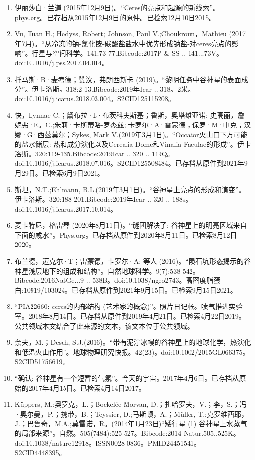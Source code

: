\begin{enumerate}
\item 伊丽莎白·兰道 (2015年12月9日)。“Ceres的亮点和起源的新线索”。phys.org。已存档从2015年12月9日的原件。已检索12月10日2015。
\item Vu, Tuan H.; Hodyss, Robert; Johnson, Paul V.;Choukroun，Mathieu (2017年7月)。“从冷冻的钠-氯化铵-碳酸盐盐水中优先形成钠盐-对ceres亮点的影响”。行星与空间科学。141:73-77.Bibcode:2017P & SS .. 141...73V。doi:10.1016/j.pss.2017.04.014。
\item 托马斯·B·麦考德；赞汶，弗朗西斯卡 (2019)。“黎明任务中谷神星的表面成分”。伊卡洛斯。318:2-13.Bibcode:2019年Icar .. 318。2米。doi:10.1016/j.icarus.2018.03.004。S2CID125115208。 
\item 快，Lynnae C.；黛布拉·L·布茨科夫斯基；鲁斯，奥塔维亚诺; 史高丽，詹妮弗·E。C.;朱莉·卡斯蒂略-罗杰兹; 卡罗尔·A·雷蒙德；保罗·M·申克；汉娜·G·西兹莫尔；Sykes, Mark V.(2019年3月1日)。“Occator火山口下方可能的盐水储层: 热和成分演化以及Cerealia Dome和Vinalia Faculae的形成”。伊卡洛斯。320:119-135.Bibcode:2019Icar .. 320 .. 119Q。doi:10.1016/j.icarus.2018.07.016。S2CID125508484。已存档从原件到2021年9月29日。已检索6月9日2021。 
\item 斯坦，N.T.;Ehlmann, B.L.(2019年3月1日)。“谷神星上亮点的形成和演变”。伊卡洛斯。320:188-201.Bibcode:2019年Icar .. 320 .. 188s。doi:10.1016/j.icarus.2017.10.014。
\item 麦卡特尼，格雷琴 (2020年8月11日)。“谜团解决了: 谷神星上的明亮区域来自下面的咸水”。Phys.org。已存档从原件到2020年8月11日。已检索8月12日2020。
\item 布兰德，迈克尔·T；雷蒙德，卡罗尔·A; 等人 (2016)。“陨石坑形态揭示的谷神星浅层地下的组成和结构”。自然地球科学。9(7):538-542。Bibcode:2016NatGe...9 .. 538B。doi:10.1038/ngeo2743。高密度脂蛋白:10919/103024。已存档从原件到2021年9月15日。已检索9月15日2021。
\item “PIA22660: ceres的内部结构 (艺术家的概念)”。照片日记帐。喷气推进实验室。2018年8月14日。已存档从原件到2019年4月21日。已检索4月22日2019。 公共领域本文结合了此来源的文本，该文本位于公共领域。
\item 奈夫，M.；Desch, S.J.(2016)。“带有泥泞冰幔的谷神星上的地球化学，热演化和低温火山作用”。地球物理研究快报。42(23)。doi:10.1002/2015GL066375。S2CID51756619。 
\item “确认: 谷神星有一个短暂的气氛”。今天的宇宙。2017年4月6日。已存档从原始的2017年4月15日。已检索4月14日2017。
\item Küppers, M.;奥罗克，L.；Bockelée-Morvan, D.；扎哈罗夫，V.；李，S.；冯·奥尔曼，P.；携带，B.；Teyssier, D.;马斯顿，A.；Müller, T.;克罗维西耶，J.；巴鲁奇，M.A.;莫雷诺，R。(2014年1月23日)“矮行星 (1) 谷神星上水蒸气的局部来源”。自然。505(7484):525-527。Bibcode:2014 Natur.505..525K。doi:10.1038/nature12918。ISSN0028-0836。PMID24451541。S2CID4448395。   

\end{enumerate}
